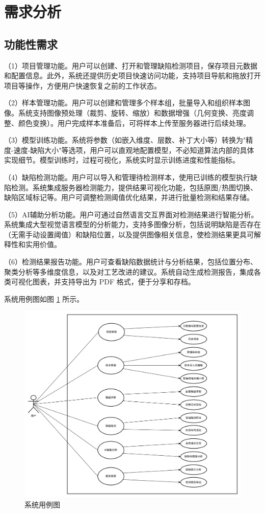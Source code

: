 \documentclass[
  ]{njuthesis}
\begin{document}
\section{需求分析}

\subsection{功能性需求}

（1）项目管理功能。用户可以创建、打开和管理缺陷检测项目，保存项目元数据和配置信息。此外，系统还提供历史项目快速访问功能，支持项目导航和拖放打开项目等操作，方便用户快速恢复之前的工作状态。

（2）样本管理功能。用户可以创建和管理多个样本组，批量导入和组织样本图像。系统支持图像预处理（裁剪、旋转、缩放）和数据增强（几何变换、亮度调整、颜色变换）。用户完成样本准备后，可将样本上传至服务器进行后续处理。

（3）模型训练功能。系统将参数（如嵌入维度、层数、补丁大小等）转换为"精度-速度-缺陷大小"等选项，用户可以直观地配置模型，不必知道算法内部的具体实现细节。模型训练时，过程可视化，系统实时显示训练进度和性能指标。

（4）缺陷检测功能。用户可以导入和管理待检测样本，使用已训练的模型执行缺陷检测。系统集成服务器检测能力，提供结果可视化功能，包括原图/热图切换、缺陷区域标记等。用户可调整检测阈值优化结果，并进行批量检测和结果存储。

（5）AI辅助分析功能。用户可通过自然语言交互界面对检测结果进行智能分析。系统集成大型视觉语言模型的分析能力，支持多图像分析，包括说明缺陷是否存在（无需手动设置阈值）和缺陷位置，以及提供图像相关信息，使检测结果更具可解释性和实用价值。

（6）检测结果报告功能。用户可查看缺陷数据统计与分析结果，包括位置分布、聚类分析等多维度信息，以及对工艺改进的建议。系统自动生成检测报告，集成各类可视化图表，并支持导出为 PDF 格式，便于分享和存档。

系统用例图如图 \ref{系统用例图} 所示。

\begin{figure}[htb]
    \centering
    \includegraphics[width=\textwidth]{images/用例图.png}
    \caption{系统用例图}
    \label{系统用例图}
\end{figure}
\end{document}
